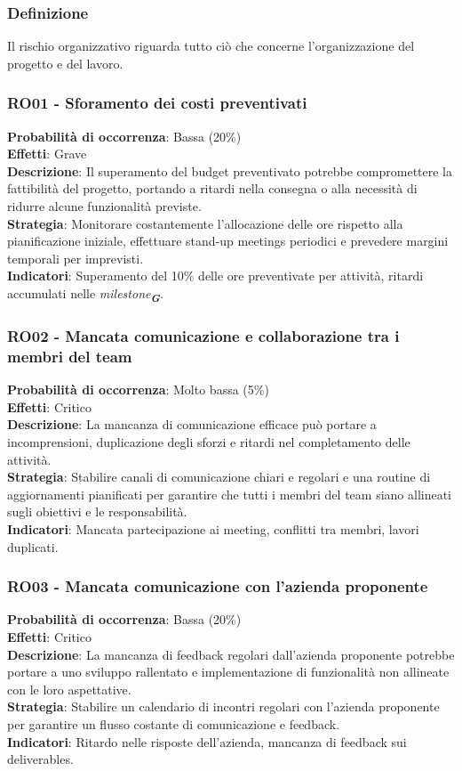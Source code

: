 \documentclass[a4paper,12pt]{article}
\newcommand{\glossario}[1]{\textit{#1}\textsubscript{\textbf{\textit{\textcolor{lightblack}{G}}}}}
\begin{document}
\subsubsection{Definizione}
Il rischio organizzativo riguarda tutto ciò che concerne l'organizzazione del progetto e del lavoro.

\subsubsection{RO01 - Sforamento dei costi preventivati}
\label{RO01}
\textbf{Probabilità di occorrenza}: Bassa (20\%)\\
\textbf{Effetti}: Grave\\
\textbf{Descrizione}: Il superamento del budget preventivato potrebbe compromettere la fattibilità del progetto, portando a ritardi nella consegna o alla necessità di ridurre alcune funzionalità previste.\\
\textbf{Strategia}: Monitorare costantemente l'allocazione delle ore rispetto alla pianificazione iniziale, effettuare stand-up meetings periodici e prevedere margini temporali per imprevisti.\\
\textbf{Indicatori}: Superamento del 10\% delle ore preventivate per attività, ritardi accumulati nelle \glossario{milestone}.

\subsubsection{RO02 - Mancata comunicazione e collaborazione tra i membri del team}
\label{RO02}
\textbf{Probabilità di occorrenza}: Molto bassa (5\%)\\
\textbf{Effetti}: Critico\\
\textbf{Descrizione}: La mancanza di comunicazione efficace può portare a incomprensioni, duplicazione degli sforzi e ritardi nel completamento delle attività.\\
\textbf{Strategia}: Stabilire canali di comunicazione chiari e regolari e una routine di aggiornamenti pianificati per garantire che tutti i membri del team siano allineati sugli obiettivi e le responsabilità.\\
\textbf{Indicatori}: Mancata partecipazione ai meeting, conflitti tra membri, lavori duplicati.

\subsubsection{RO03 - Mancata comunicazione con l'azienda proponente}
\label{RO03}
\textbf{Probabilità di occorrenza}: Bassa (20\%)\\
\textbf{Effetti}: Critico\\
\textbf{Descrizione}: La mancanza di feedback regolari dall'azienda proponente potrebbe portare a uno sviluppo rallentato e implementazione di funzionalità non allineate con le loro aspettative.\\
\textbf{Strategia}: Stabilire un calendario di incontri regolari con l'azienda proponente per garantire un flusso costante di comunicazione e feedback.\\
\textbf{Indicatori}: Ritardo nelle risposte dell'azienda, mancanza di feedback sui deliverables.
\end{document}
